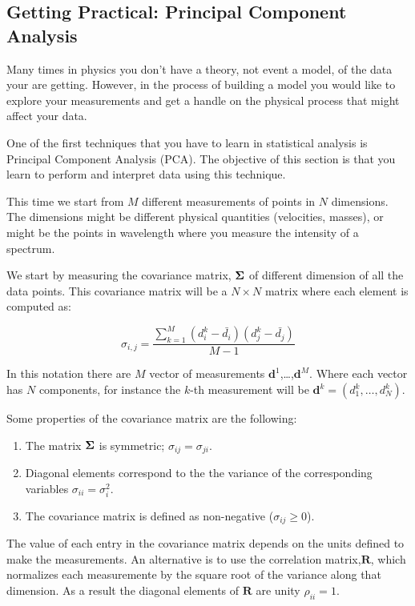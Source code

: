 \documentclass{article}
\begin{document}
\subsection{Getting Practical: Principal Component Analysis}

Many times in physics you don't have a theory, not event a model, of the data your are getting. However, in the process of building a model you would like to explore your measurements and get a handle on the physical process that might affect your data.

One of the first techniques that you have to learn in statistical analysis is Principal Component Analysis (PCA). The objective of this section is that you learn to perform and interpret data using this technique.

This time we start from $M$ different measurements of points in $N$ dimensions. The dimensions might be different physical quantities (velocities, masses), or might be the points in wavelength where you measure the intensity of a spectrum.

We start by measuring the covariance matrix, ${\bf\Sigma}$ of different dimension of all the data points. This covariance matrix will be a $N\times N$ matrix where each element is computed as:

\begin{equation}
\sigma_{i,j} = \frac{\sum_{k=1}^{M} (d^{k}_i - \bar{d_i})(d^{k}_j -\bar{d_{j}})}{M-1}
\end{equation}

In this notation there are $M$ vector of measurements ${\mathbf d}^{1}$,\ldots,${\mathbf d}^{M}$. Where each vector has $N$ components, for instance the $k$-th measurement will be ${\mathbf d}^{k}=(d^k_{1},\ldots,d^k_{N})$.

Some properties of the covariance matrix are the following:
\begin{enumerate}
\item The matrix ${\bf\Sigma}$ is symmetric;
  $\sigma_{ij}=\sigma_{ji}$.
\item Diagonal elements correspond to the the variance of the
  corresponding variables $\sigma_{ii}=\sigma_i^2$.
\item The covariance matrix is defined as non-negative
  ($\sigma_{ij}\geq 0$).
\end{enumerate}

The value of each entry in the covariance matrix depends on the units
defined to make the measurements. An alternative is to use the
correlation matrix,${\mathbf R}$, which normalizes each measuremente
by the square root of the variance along that dimension. As a result
the diagonal elements of ${\mathbf R}$ are unity $\rho_{ii}=1$.
\end{document}
